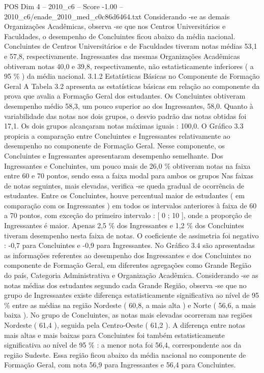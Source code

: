 \begin{textsample}{POS Dim 4 – 2010\_c6 – Score -1.00 – 2010\_c6/enade\_2010\_med\_c0c86d6464.txt}
Considerando -se as demais Organizações Acadêmicas, observa -se que nos Centros Universitários e Faculdades, o desempenho de Concluintes ficou abaixo da média nacional.
Concluintes de Centros Universitários e de Faculdades tiveram notas médias 53,1 e 57,8, respectivamente.
Ingressantes das mesmas Organizações Acadêmicas obtiveram notas 40,0 e 39,8, respectivamente, não estatisticamente inferiores ( a 95 \% ) da média nacional. 3.1.2 Estatísticas Básicas no Componente de Formação Geral A Tabela 3.2 apresenta as estatísticas básicas em relação ao componente da prova que avalia a Formação Geral dos estudantes.
Os Concluintes obtiveram desempenho médio 58,3, um pouco superior ao dos Ingressantes, 58,0.
Quanto à variabilidade das notas nos dois grupos, o desvio padrão das notas obtidas foi 17,1.
Os dois grupos alcançaram notas máximas iguais : 100,0.
O Gráfico 3.3 propicia a comparação entre Concluintes e Ingressantes relativamente ao desempenho no componente de Formação Geral.
Nesse componente, os Concluintes e Ingressantes apresentaram desempenho semelhante.
Dos Ingressantes e Concluintes, um pouco mais de 26,0 \% obtiveram notas na faixa entre 60 e 70 pontos, sendo essa a faixa modal para ambos os grupos Nas faixas de notas seguintes, mais elevadas, verifica -se queda gradual de ocorrência de estudantes.
Entre os Concluintes, houve percentual maior de estudantes ( em comparação com os Ingressantes ) em todos os intervalos anteriores à faixa de 60 a 70 pontos, com exceção do primeiro intervalo : [ 0 ; 10 ], onde a proporção de Ingressantes é maior.
Apenas 2,5 \% dos Ingressantes e 1,2 \% dos Concluintes tiveram desempenho nesta faixa de notas.
O coeficiente de assimetria foi negativo : -0,7 para Concluintes e -0,9 para Ingressantes.
No Gráfico 3.4 são apresentadas as informações referentes ao desempenho dos Ingressantes e dos Concluintes no componente de Formação Geral, em diferentes agregações como Grande Região do país, Categoria Administrativa e Organização Acadêmica.
Considerando -se as notas médias dos estudantes segundo cada Grande Região, observa -se que no grupo de Ingressantes existe diferença estatisticamente significativa ao nível de 95 \% entre as médias na região Nordeste ( 60,8, a mais alta ) e Norte ( 56,6, a mais baixa ).
No grupo de Concluintes, as notas mais elevadas ocorreram nas regiões Nordeste ( 61,4 ), seguida pela Centro-Oeste ( 61,2 ).
A diferença entre notas mais altas e mais baixas para Concluintes foi também estatisticamente significativa ao nível de 95 \% : a menor nota foi 56,4, correspondente aos da região Sudeste.
Essa região ficou abaixo da média nacional no componente de Formação Geral, com nota 56,9 para Ingressantes e 56,4 para Concluintes.

\end{textsample}
